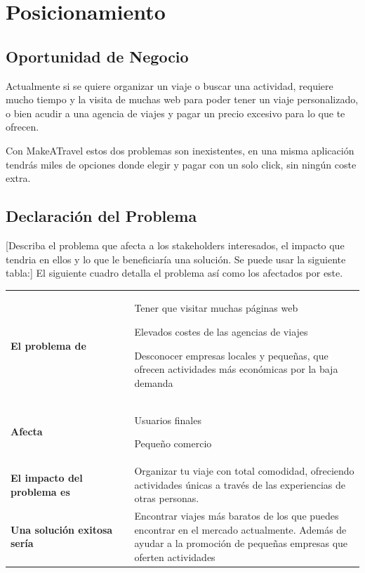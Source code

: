 \documentclass[11pt]{article}
\begin{document}
\section{Posicionamiento}
\subsection{Oportunidad de Negocio}
Actualmente si se quiere organizar un viaje o buscar una actividad,  requiere mucho tiempo y la visita de muchas web para poder tener un viaje personalizado, o bien acudir a una agencia de viajes y pagar un precio excesivo para lo que te ofrecen.

Con MakeATravel estos dos problemas son inexistentes, en una misma aplicación tendrás miles de opciones donde elegir y pagar con un solo click, sin ningún coste extra.


\subsection{Declaración del Problema}
[Describa el problema que afecta a los stakeholders interesados, el impacto que tendria en ellos y lo que le beneficiaría una solución. Se puede usar la siguiente tabla:]
El siguiente cuadro detalla el problema así como los afectados por este.

\begin{table}[H]
  \centering
  \begin{tabular}{p{0.35\linewidth}|p{0.65\linewidth}}
    \toprule
    \textbf{El problema de} & Tener que visitar muchas páginas web
    
    Elevados costes de las agencias de viajes
    
    Desconocer empresas locales y pequeñas, que ofrecen actividades más económicas por la baja demanda\\
    \textbf{Afecta} & Usuarios finales 
    
    Pequeño comercio\\
    \textbf{El impacto del problema es} & Organizar tu viaje con total comodidad, ofreciendo actividades únicas a través de las experiencias de otras personas.\\
    \textbf{Una solución exitosa sería} & Encontrar viajes más baratos de los que puedes encontrar en el mercado actualmente. Además de ayudar a la promoción de pequeñas empresas que oferten actividades\\
    \bottomrule
  \end{tabular}
\end{table}
\end{document}
